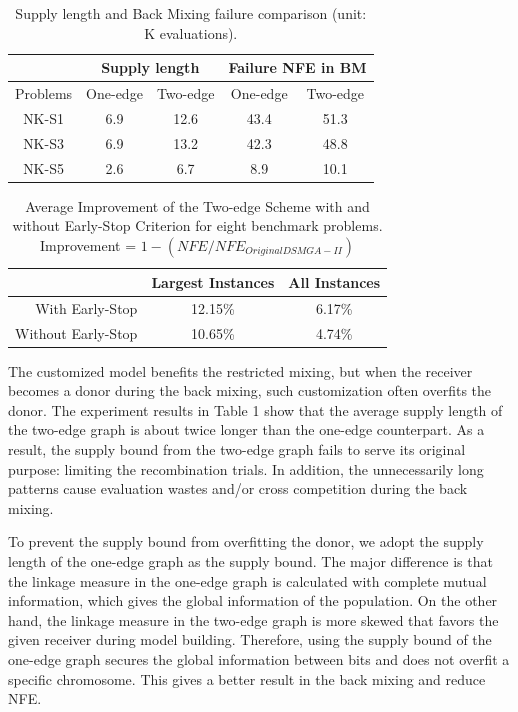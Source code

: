 \begin{table}[t!]
\begin{tabular}{|c|c|c|c|c|}
\hline
 &
\multicolumn{2}{c|}{Supply length} &
\multicolumn{2}{c|}{Failure NFE in BM} \\
\hline
Problems  		& One-edge & Two-edge	& One-edge & Two-edge \\\hline
NK-S1 			&  6.9 		&12.6  		&43.4 		& 51.3 \\\hline
NK-S3 			& 6.9  		& 13.2  	&42.3 		& 48.8 \\\hline
NK-S5 			& 2.6  		&6.7 		&8.9		& 10.1 \\\hline

\end{tabular}
\caption{Supply length and Back Mixing failure comparison (unit: K evaluations).}
\end{table}

\begin{table}[]
\begin{tabular}{|r|c|c|}
\hline
						& Largest Instances	 & All Instances		\\\hline
With Early-Stop		& 12.15\%				 & 6.17\% 			  	\\\hline
Without Early-Stop	& 10.65\%  			 & 4.74\%   			\\\hline


\end{tabular}
\caption{Average Improvement of the Two-edge Scheme with and without Early-Stop Criterion for eight benchmark problems. 
Improvement = $1 - (NFE/NFE_{Original DSMGA-II})$}
\end{table}


The customized model benefits the restricted mixing, but when the receiver becomes a donor during the back mixing, such customization often overfits the donor. The experiment results in Table 1 show that the average supply length of the two-edge graph is about twice longer than the one-edge counterpart. As a result, the supply bound from the two-edge graph fails to serve its original purpose: limiting the recombination trials. In addition, the unnecessarily long patterns cause evaluation wastes and/or cross competition during the back mixing. 


To prevent the supply bound from overfitting the donor, we adopt the supply length of the one-edge graph as the supply bound. The major difference is that the linkage measure in the one-edge graph is calculated with complete mutual information, which gives the global information of the population. On the other hand, the linkage measure in the two-edge graph is more skewed that favors the given receiver during model building. Therefore, using the supply bound of the one-edge graph secures the global information between bits and does not overfit a specific chromosome. This gives a better result in the back mixing and reduce NFE.


